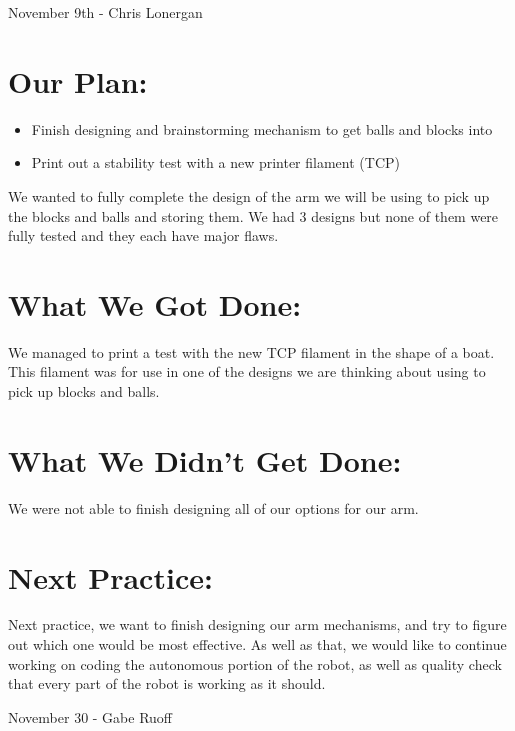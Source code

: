 \documentclass[12pt]{article}
\begin{document}
\newpage
\setcounter{section}{0}

November 9th - Chris Lonergan

\section{Our Plan:} 
\begin{itemize}
	\item Finish designing and brainstorming mechanism to get balls and blocks into  
	\item Print out a stability test with a new printer filament (TCP)
\end{itemize}

We wanted to fully complete the design of the arm we will be using to pick up the blocks and balls and storing them. We had 3 designs but none of them were fully tested and they each have major flaws.

\section{What We Got Done:} 

We managed to print a test with the new TCP filament in the shape of a boat. This filament was for use in one of the designs we are thinking about using to pick up blocks and balls.

\section{What We Didn't Get Done:} 

We were not able to finish designing all of our options for our arm.

\section{Next Practice:}

Next practice, we want to finish designing our arm mechanisms, and try to figure out which one would be most effective. As well as that, we would like to continue working on coding the autonomous portion of the robot, as well as quality check that every part of the robot is working as it should.

\newpage
\setcounter{section}{0}

November 30 - Gabe Ruoff
\end{document}
